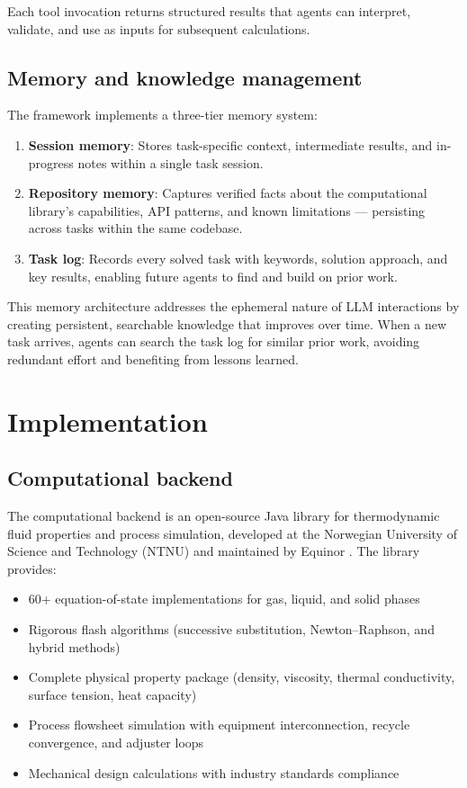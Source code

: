 \documentclass[review,3p]{elsarticle}
\begin{document}
Each tool invocation returns structured results that agents can interpret, validate, and use as inputs for subsequent calculations.

\subsection{Memory and knowledge management}

The framework implements a three-tier memory system:

\begin{enumerate}
  \item \textbf{Session memory}: Stores task-specific context, intermediate results, and in-progress notes within a single task session.
  \item \textbf{Repository memory}: Captures verified facts about the computational library's capabilities, API patterns, and known limitations --- persisting across tasks within the same codebase.
  \item \textbf{Task log}: Records every solved task with keywords, solution approach, and key results, enabling future agents to find and build on prior work.
\end{enumerate}

This memory architecture addresses the ephemeral nature of LLM interactions by creating persistent, searchable knowledge that improves over time. When a new task arrives, agents can search the task log for similar prior work, avoiding redundant effort and benefiting from lessons learned.


\section{Implementation}


\subsection{Computational backend}

The computational backend is an open-source Java library for thermodynamic fluid properties and process simulation, developed at the Norwegian University of Science and Technology (NTNU) and maintained by Equinor \citep{neqsim2024}. The library provides:

\begin{itemize}
  \item 60+ equation-of-state implementations for gas, liquid, and solid phases
  \item Rigorous flash algorithms (successive substitution, Newton–Raphson, and hybrid methods)
  \item Complete physical property package (density, viscosity, thermal conductivity, surface tension, heat capacity)
  \item Process flowsheet simulation with equipment interconnection, recycle convergence, and adjuster loops
  \item Mechanical design calculations with industry standards compliance
\end{itemize}
\end{document}
